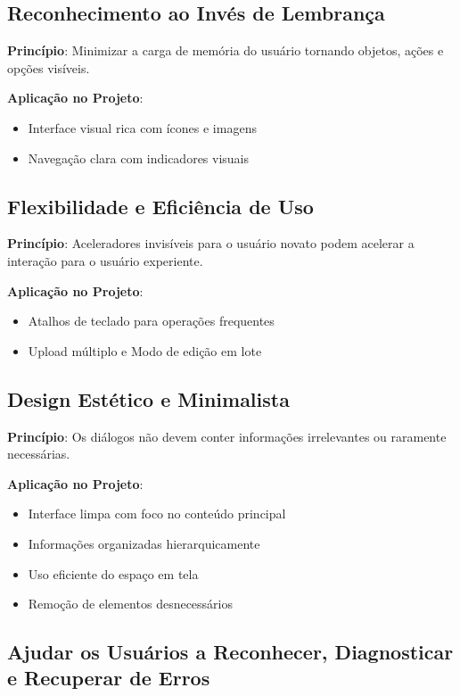 \subsection{Reconhecimento ao Invés de Lembrança}

\textbf{Princípio}: Minimizar a carga de memória do usuário tornando objetos, ações e opções visíveis.

\textbf{Aplicação no Projeto}:
\begin{itemize}
    \item Interface visual rica com ícones e imagens
    \item Navegação clara com indicadores visuais
\end{itemize}

\subsection{Flexibilidade e Eficiência de Uso}

\textbf{Princípio}: Aceleradores invisíveis para o usuário novato podem acelerar a interação para o usuário experiente.

\textbf{Aplicação no Projeto}:
\begin{itemize}
    \item Atalhos de teclado para operações frequentes
    \item Upload múltiplo e Modo de edição em lote
\end{itemize}

\subsection{Design Estético e Minimalista}

\textbf{Princípio}: Os diálogos não devem conter informações irrelevantes ou raramente necessárias.

\textbf{Aplicação no Projeto}:
\begin{itemize}
    \item Interface limpa com foco no conteúdo principal
    \item Informações organizadas hierarquicamente
    \item Uso eficiente do espaço em tela
    \item Remoção de elementos desnecessários
\end{itemize}

\subsection{Ajudar os Usuários a Reconhecer, Diagnosticar e Recuperar de Erros}

